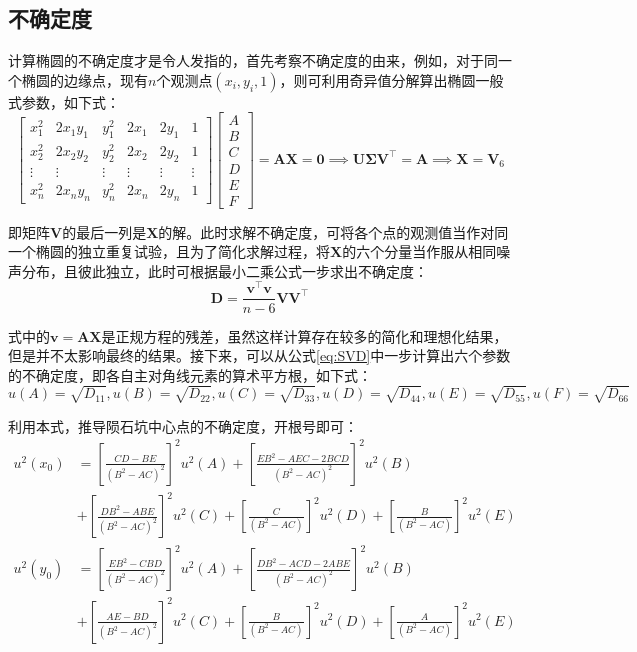 \documentclass{article}
\begin{document}
\subsection{不确定度}
计算椭圆的不确定度才是令人发指的，首先考察不确定度的由来，例如，对于同一个椭圆的边缘点，现有$n$个观测点$(x_i,y_i,1)$，则可利用奇异值分解算出椭圆一般式参数，如下式：
\begin{equation*}
  \begin{bmatrix}
    x_1^2&2x_1y_1&y^2_1&2x_1&2y_1&1\\
    x_2^2&2x_2y_2&y^2_2&2x_2&2y_2&1\\
    \vdots&\vdots&\vdots&\vdots&\vdots&\vdots\\
    x_n^2&2x_ny_n&y^2_n&2x_n&2y_n&1
\end{bmatrix}
  \begin{bmatrix}
    A\\B\\C\\D\\E\\F
  \end{bmatrix}=\mathbf{AX}=\mathbf{0}\implies\mathbf{U}\mathbold{\Sigma}\mathbf{ V}^\top=\mathbf{A}\implies\mathbf{X}=\mathbf{V}_6
\end{equation*}\par
即矩阵$\mathbf{V}$的最后一列是$\mathbf{X}$的解。此时求解不确定度，可将各个点的观测值当作对同一个椭圆的独立重复试验，且为了简化求解过程，将$\mathbf{X}$的六个分量当作服从相同噪声分布，且彼此独立，此时可根据最小二乘公式一步求出不确定度：
\begin{equation}
  \mathbf{D}=\frac{\mathbf{v^\top v}}{n-6}\mathbf{VV^\top}
  \label{eq:SVD}
\end{equation}\par
式中的$\mathbf{v=AX}$是正规方程的残差，虽然这样计算存在较多的简化和理想化结果，但是并不太影响最终的结果。接下来，可以从公式\ref{eq:SVD}中一步计算出六个参数的不确定度，即各自主对角线元素的算术平方根，如下式：
\begin{equation*}
  u(A)=\sqrt{D_{11}},u(B)=\sqrt{D_{22}},u(C)=\sqrt{D_{33}},u(D)=\sqrt{D_{44}},u(E)=\sqrt{D_{55}},u(F)=\sqrt{D_{66}}
\end{equation*}\par
利用本式，推导陨石坑中心点的不确定度，开根号即可：
\begin{equation}
  \begin{aligned}
    u^2(x_0)&=\left[\frac{CD-BE}{(B^2-AC)^2}\right]^2u^2(A)+\left[\frac{EB^2-AEC-2BCD}{(B^2-AC)^2}\right]^2u^2(B)\\
    &+\left[\frac{DB^2-ABE}{(B^2-AC)^2}\right]^2u^2(C)+\left[\frac{C}{(B^2-AC)}\right]^2u^2(D)+\left[\frac{B}{(B^2-AC)}\right]^2u^2(E)\\
    u^2(y_0)&=\left[\frac{EB^2-CBD}{(B^2-AC)^2}\right]^2u^2(A)+\left[\frac{DB^2-ACD-2ABE}{(B^2-AC)^2}\right]^2u^2(B)\\
    &+\left[\frac{AE-BD}{(B^2-AC)^2}\right]^2u^2(C)+\left[\frac{B}{(B^2-AC)}\right]^2u^2(D)+\left[\frac{A}{(B^2-AC)}\right]^2u^2(E)\\
  \end{aligned}
  \label{eq:center-uncertainty}
\end{equation}\par
\end{document}
